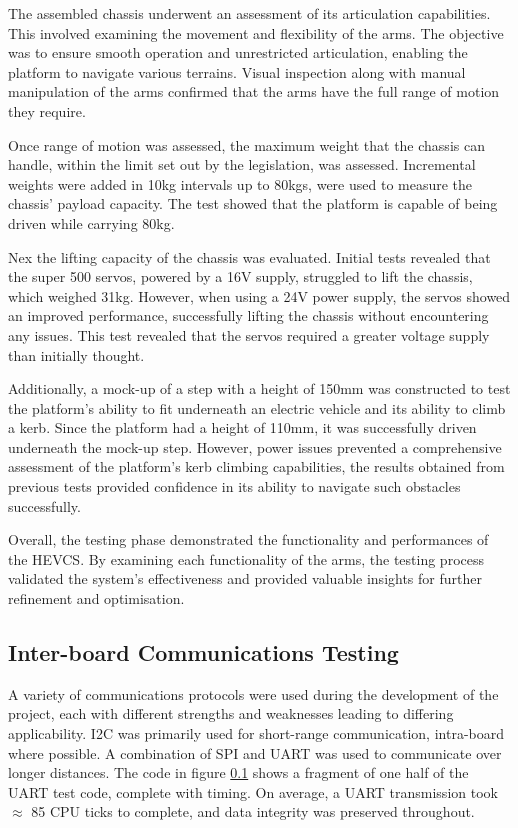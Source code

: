 \documentclass [12pt]{article}
\begin{document}
The assembled chassis underwent an assessment of its articulation capabilities. This involved examining the movement and flexibility of the arms. The objective was to ensure smooth operation and unrestricted articulation, enabling the platform to navigate various terrains. Visual inspection along with manual manipulation of the arms confirmed that the arms have the full range of motion they require.

Once range of motion was assessed, the maximum weight that the chassis can handle, within the limit set out by the legislation, was assessed. Incremental weights were added in 10kg intervals up to 80kgs, were used to measure the chassis’ payload capacity. The test showed that the platform is capable of being driven while carrying 80kg.

Nex the lifting capacity of the chassis was evaluated. Initial tests revealed that the super 500 servos, powered by a 16V supply, struggled to lift the chassis, which weighed 31kg. However, when using a 24V power supply, the servos showed an improved performance, successfully lifting the chassis without encountering any issues. This test revealed that the servos required a greater voltage supply than initially thought.

Additionally, a mock-up of a step with a height of 150mm was constructed to test the platform’s ability to fit underneath an electric vehicle and its ability to climb a kerb. Since the platform had a height of 110mm, it was successfully driven underneath the mock-up step. However, power issues prevented a comprehensive assessment of the platform’s kerb climbing capabilities, the results obtained from previous tests provided confidence in its ability to navigate such obstacles successfully.

Overall, the testing phase demonstrated the functionality and performances of the HEVCS. By examining each functionality of the arms, the testing process validated the system’s effectiveness and provided valuable insights for further refinement and optimisation.


\subsection{Inter-board Communications Testing}

A variety of communications protocols were used during the development of the project, each with different strengths and weaknesses leading to differing applicability. I2C was primarily used for short-range communication, intra-board where possible. A combination of SPI and UART was used to communicate over longer distances. The code in figure \ref{} shows a fragment of one half of the UART test code, complete with timing. On average, a UART transmission took $\approx$ 85 CPU ticks to complete, and data integrity was preserved throughout.
\end{document}
